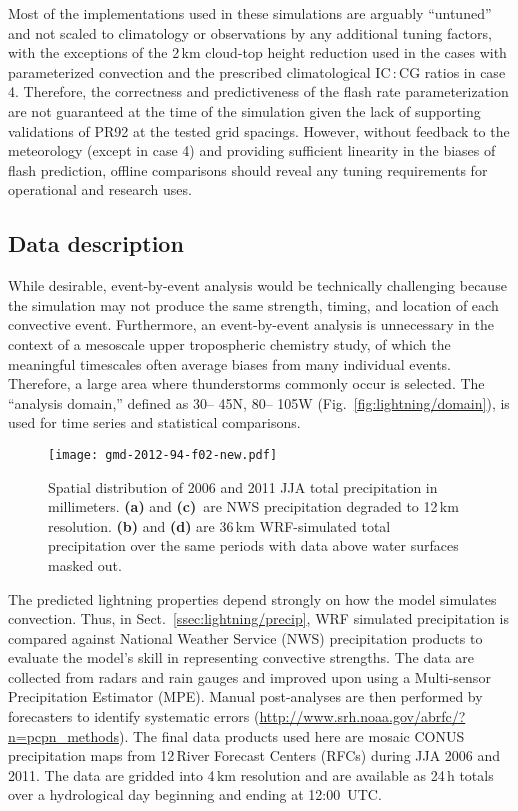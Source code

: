 Most of the implementations used in these simulations are arguably
``untuned'' and not scaled to climatology or observations by any additional
tuning factors, with the exceptions of the 2\,\unit{km} cloud-top height
reduction used in the cases with parameterized convection and the prescribed
climatological IC\,:\,CG ratios in case 4. Therefore, the correctness and
predictiveness of the flash rate parameterization are not guaranteed at the
time of the simulation given the lack of supporting validations of PR92 at
the tested grid spacings. However, without feedback to the meteorology
(except in case 4) and providing sufficient linearity in the biases of flash
prediction, offline comparisons should reveal any tuning requirements for
operational and research uses.

\subsection{Data description}\label{ssec:lightning/data}

While desirable, event-by-event analysis would be technically challenging
because the simulation may not produce the same strength, timing, and
location of each convective event. Furthermore, an event-by-event analysis is
unnecessary in the context of a mesoscale upper tropospheric chemistry study,
of which the meaningful timescales often average biases from many individual
events. Therefore, a large area where thunderstorms commonly occur is
selected. The ``analysis domain,'' defined as 30\degr -- 45\degr N,
80\degr -- 105\degr W (Fig.~\ref{fig:lightning/domain}), is used for time series
and statistical comparisons.


\begin{figure*}[t]
\texttt{[image: gmd-2012-94-f02-new.pdf]}
\caption[Spatial distribution of JJA total precipitation in 2006 and 2011]
{Spatial distribution of 2006 and 2011 JJA total precipitation in
millimeters. \textbf{(a)} and \textbf{(c)}~are NWS precipitation degraded to
12\,\unit{km} resolution. \textbf{(b)} and \textbf{(d)} are 36\,\unit{km}
WRF-simulated total precipitation over the same periods with data above water
surfaces masked out.} \label{fig:lightning/precipmap}
\end{figure*}



The predicted lightning properties depend strongly on how the model simulates
convection. Thus, in Sect.~\ref{ssec:lightning/precip}, WRF simulated precipitation
is compared against National Weather Service (NWS) precipitation products to
evaluate the model's skill in representing convective strengths. The data are
collected from radars and rain gauges and \mbox{improved} upon using a Multi-sensor
Precipitation Estimator (MPE). Manual post-analyses are then performed by
forecasters to identify systematic errors
(\url{http://www.srh.noaa.gov/abrfc/?n=pcpn\_methods}). The final data products
used here are mosaic CONUS precipitation maps from 12\,River Forecast Centers
(RFCs) during JJA 2006 and 2011. The data are gridded into 4\,\unit{km}
resolution and are available as 24\,h totals over a hydrological day
beginning and ending at 12:00~UTC.

